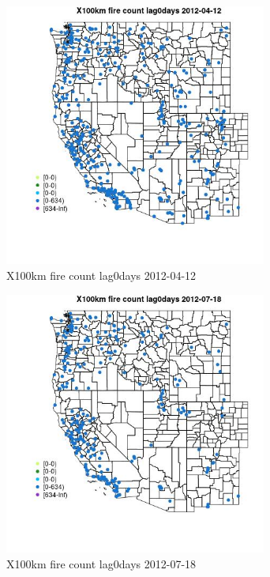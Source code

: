 \begin{figure} 
\centering  
\includegraphics[width=0.77\textwidth]{Code_Outputs/Report_ML_input_PM25_Step4_part_e_de_duplicated_aves_compiled_2019-05-14wNAs_MapObsX100km_fire_count_lag0days2012-04-12.jpg} 
\caption{\label{fig:Report_ML_input_PM25_Step4_part_e_de_duplicated_aves_compiled_2019-05-14wNAsMapObsX100km_fire_count_lag0days2012-04-12}X100km fire count lag0days 2012-04-12} 
\end{figure} 
 

\clearpage 

\begin{figure} 
\centering  
\includegraphics[width=0.77\textwidth]{Code_Outputs/Report_ML_input_PM25_Step4_part_e_de_duplicated_aves_compiled_2019-05-14wNAs_MapObsX100km_fire_count_lag0days2012-07-18.jpg} 
\caption{\label{fig:Report_ML_input_PM25_Step4_part_e_de_duplicated_aves_compiled_2019-05-14wNAsMapObsX100km_fire_count_lag0days2012-07-18}X100km fire count lag0days 2012-07-18} 
\end{figure} 
 

